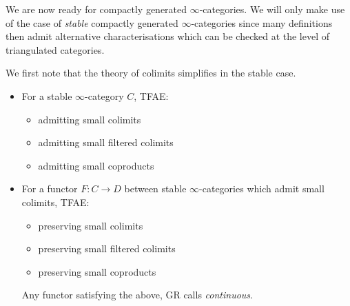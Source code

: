 \documentclass[./main.tex]{subfiles}
\begin{document}
  
We are now ready for compactly generated $\infty$-categories.
We will only make use of the case of 
\emph{stable} compactly generated $\infty$-categories
since many definitions then admit alternative characterisations
which can be checked at the level of triangulated categories.

We first note that the theory of colimits
simplifies in the stable case.
\begin{prop}
  
  \begin{itemize}
    \item For a stable $\infty$-category $C$, TFAE: 
    \begin{itemize}
      \item admitting small colimits
      \item admitting small filtered colimits
      \item admitting small coproducts
    \end{itemize}
    \item For a functor $F : C \to D$ between stable $\infty$-categories
    which admit small colimits, TFAE: 
    \begin{itemize}
      \item preserving small colimits
      \item preserving small filtered colimits
      \item preserving small coproducts
    \end{itemize}
    Any functor satisfying the above, GR calls \emph{continuous}.
  \end{itemize}
  \cite[Prop 1.4.4.1]{Lurie-HA}
\end{prop}
\end{document}
